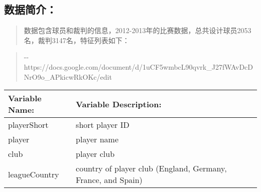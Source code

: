 \documentclass[11pt]{article}
\begin{document}
    \subsection{数据简介：}\label{ux6570ux636eux7b80ux4ecb}

\begin{quote}
数据包含球员和裁判的信息，2012-2013年的比赛数据，总共设计球员2053名，裁判3147名，特征列表如下：
\end{quote}

\begin{quote}
-\/-
https://docs.google.com/document/d/1uCF5wmbcL90qvrk\_J27fWAvDcDNrO9o\_APkicwRkOKc/edit
\end{quote}

\begin{longtable}[]{@{}ll@{}}
\toprule
\begin{minipage}[b]{0.04\columnwidth}\raggedright\strut
Variable Name:\strut
\end{minipage} & \begin{minipage}[b]{0.04\columnwidth}\raggedright\strut
Variable Description:\strut
\end{minipage}\tabularnewline
\midrule
\endhead
\begin{minipage}[t]{0.04\columnwidth}\raggedright\strut
playerShort\strut
\end{minipage} & \begin{minipage}[t]{0.04\columnwidth}\raggedright\strut
short player ID\strut
\end{minipage}\tabularnewline
\begin{minipage}[t]{0.04\columnwidth}\raggedright\strut
player\strut
\end{minipage} & \begin{minipage}[t]{0.04\columnwidth}\raggedright\strut
player name\strut
\end{minipage}\tabularnewline
\begin{minipage}[t]{0.04\columnwidth}\raggedright\strut
club\strut
\end{minipage} & \begin{minipage}[t]{0.04\columnwidth}\raggedright\strut
player club\strut
\end{minipage}\tabularnewline
\begin{minipage}[t]{0.04\columnwidth}\raggedright\strut
leagueCountry\strut
\end{minipage} & \begin{minipage}[t]{0.04\columnwidth}\raggedright\strut
country of player club (England, Germany, France, and Spain)\strut

\end{minipage}
\end{longtable}
\end{document}
